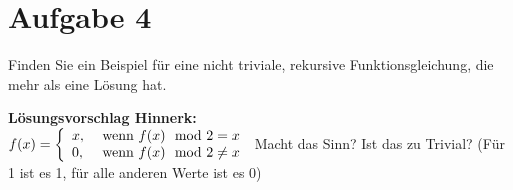 \documentclass[ngerman,a4paper]{report}
\begin{document}
\section*{Aufgabe 4}
Finden Sie ein Beispiel für eine nicht triviale, rekursive Funktionsgleichung, die mehr als eine Lösung hat.


\textbf{Lösungsvorschlag Hinnerk:}\\
$f(x) = \left\lbrace\begin{array}{l l}
	x, & \text{ wenn } f(x) \mod 2 = x \\
	0, & \text{ wenn } f(x) \mod 2 \neq x
	\end{array}\right.$
Macht das Sinn? Ist das zu Trivial?
(Für 1 ist es 1, für alle anderen Werte ist es 0)
\end{document}
